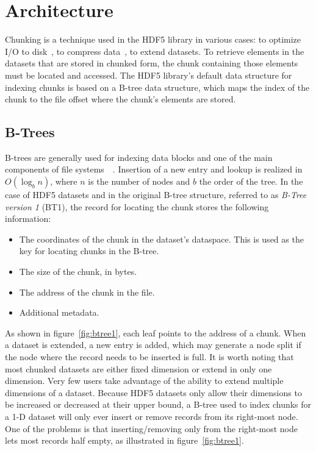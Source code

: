 \section{Architecture}
\label{sec:architecture}

\begin{figure*}
\centering

\caption{Simplified version of original B-tree structure used for indexing 
chunks. In the case of extendable datasets, whenever a new chunk is added to 
the B-tree, its right-most node, if full, is split and a new half empty node 
is created.}
\label{fig:btree1}
\end{figure*}

Chunking is a technique used in the HDF5 library in various cases:
to optimize I/O to disk~\cite{Howison2010}, to compress data~\cite{Folk2011},
to extend datasets.
To retrieve elements in the datasets that are stored in chunked form, the 
chunk containing those elements must be located and accessed. 
The HDF5 library's default data structure for indexing chunks is based on
a B-tree data structure, which maps the index of the chunk to the file offset
where the chunk's elements are stored.

\subsection{B-Trees}

B-trees are generally used for indexing data blocks
and one of the main components of file systems~\cite{Comer1979}~\cite{Folk1992}. 
Insertion of a new entry and lookup is realized in $O(\log_b{n})$, where $n$ is the
number of nodes and $b$ the order of the tree.
In the case of HDF5 datasets and in the original B-tree structure, referred to
as \textit{B-Tree version 1} (BT1), the record for locating the chunk stores the
following information:
\begin{itemize}
\item The coordinates of the chunk in the dataset's dataspace. This is used
as the key for locating chunks in the B-tree.
\item The size of the chunk, in bytes.
\item The address of the chunk in the file.
\item Additional metadata.
\end{itemize}

As shown in figure~\ref{fig:btree1}, each leaf points to the address of a
chunk. When a dataset is extended, a new entry is added, which may
generate a node split if the node where the record needs to be inserted is full. 
It is worth noting that most chunked datasets are either fixed dimension or
extend in only one dimension. Very few users take advantage of the ability to 
extend multiple dimensions of a dataset.
Because HDF5 datasets only allow their dimensions to be increased or 
decreased at their upper bound, a B-tree used to index chunks for a 1-D 
dataset will only ever insert or remove records from its right-most node.
One of the problems is that inserting/removing only from the right-most
node lets most records half empty, as illustrated in 
figure~\ref{fig:btree1}.

